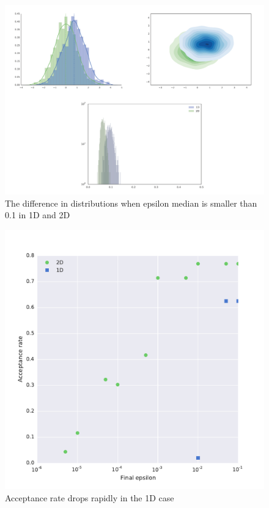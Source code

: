 \begin{figure}[htbp]
\centering
\includegraphics[scale=0.6]{chapterABCFlow/images/epsilon0-1.png}
\caption{The difference in distributions when epsilon median is smaller than 0.1 in 1D and 2D }
\label{fig:epsilon_0.1}
\end{figure}



\begin{figure}[htbp]
\centering
\includegraphics[scale=0.5]{chapterABCFlow/images/accept_rate_2d_1d.pdf}
\caption{Acceptance rate drops rapidly in the 1D case}
\label{fig:epsilon_acceptance_rate}
\end{figure}




